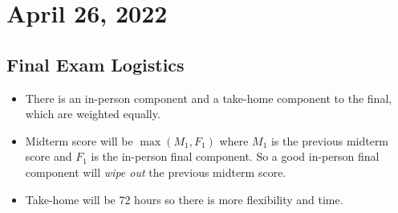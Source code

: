 \section{April 26, 2022}

\subsection{Final Exam Logistics}
\begin{itemize}
    \item There is an in-person component and a take-home component to the final, which are weighted equally.
    \item Midterm score will be $\max(M_1, F_1)$ where $M_1$ is the previous midterm score and $F_1$ is the in-person final component. So a good in-person final component will \emph{wipe out} the previous midterm score.
    \item Take-home will be 72 hours so there is more flexibility and time.
\end{itemize}

